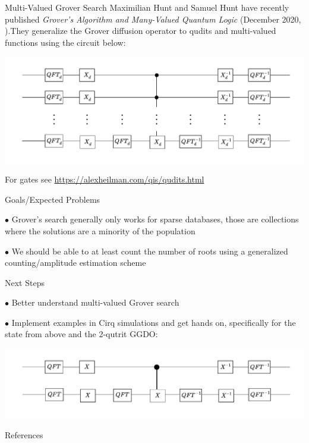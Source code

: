 \documentclass[xcolor=dvipsnames]{beamer}
\begin{document}
\begin{frame}{Multi-Valued Grover Search}
Maximilian Hunt and Samuel Hunt have recently published \textit{Grover’s Algorithm and Many-Valued Quantum Logic
}(December 2020, \cite{hunt2020}).\pause They generalize the Grover diffusion operator to qudits and multi-valued functions using the circuit below:

\includegraphics[scale=.45]{GGDO.pdf}

For gates see \url{https://alexheilman.com/qis/qudits.html}
\end{frame}


\begin{frame}{Goals/Expected Problems}

$\bullet$ Grover's search generally only works for sparse 
          databases\pause, those are collections
          where the solutions are a minority of the population
          \pause
          
          \medskip
          
$\bullet$ We should be able to at least count the number of
          roots using a generalized counting/amplitude
          estimation scheme
          

\end{frame}

\begin{frame}{Next Steps}

$\bullet$ Better understand multi-valued Grover search\pause

\medskip 

$\bullet$ Implement examples in Cirq simulations and get hands on\pause, specifically for the state from above and the 2-qutrit GGDO:

\includegraphics[scale=.45]{2qtGGDO.pdf}



\end{frame}





\begin{frame}[allowframebreaks]{References}
    \nocite{*}
    \printbibliography

\end{frame}
\end{document}
